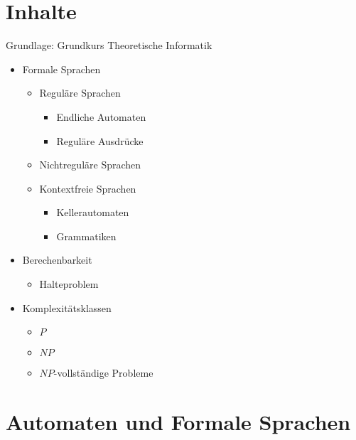 






\maketitle
\newpage
\tableofcontents
\newpage

\chapter*{Inhalte}
Grundlage: Grundkurs Theoretische Informatik \cite{hollas2015grundkurs}
\begin{itemize}
\item Formale Sprachen
\begin{itemize}
\item Reguläre Sprachen
\begin{itemize}
\item Endliche Automaten
\item Reguläre Ausdrücke
\end{itemize}
\item Nichtreguläre Sprachen
\item Kontextfreie Sprachen
\begin{itemize}
\item Kellerautomaten
\item Grammatiken
\end{itemize}
\end{itemize}
\item Berechenbarkeit
\begin{itemize}
\item Halteproblem
\end{itemize}
\item Komplexitätsklassen
\begin{itemize}
\item $P$
\item $NP$
\item $NP$-vollständige Probleme
\end{itemize}
\end{itemize}

\chapter{Automaten und Formale Sprachen}

